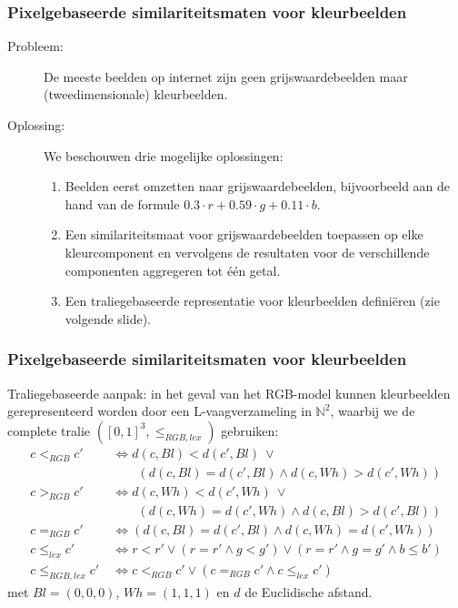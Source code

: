 \documentclass[dutch]{beamer}
\theoremstyle{definition}
\theoremstyle{remark}
\theoremstyle{example}
\begin{document}
{
  \frametitle{Pixelgebaseerde similariteitsmaten voor kleurbeelden}
  
  \begin{description}
     \item[Probleem:] De meeste beelden op internet zijn 
     geen grijswaardebeelden maar (tweedimensionale) kleurbeelden.
     \item[Oplossing:] We beschouwen drie mogelijke oplossingen:
     \begin{enumerate}
       \item Beelden eerst omzetten naar grijswaardebeelden, bijvoorbeeld aan de 
       hand van de formule $0.3 \cdot r + 0.59 \cdot g + 0.11 \cdot b$.
       \item Een similariteitsmaat voor grijswaardebeelden toepassen op elke
       kleurcomponent en vervolgens de resultaten voor de verschillende componenten
       aggregeren tot \'e\'en getal.
       \item Een traliegebaseerde representatie voor kleurbeelden defini\"eren (zie
       volgende slide).
     \end{enumerate}
   \end{description}
}
\frame
{
  \frametitle{Pixelgebaseerde similariteitsmaten voor kleurbeelden}

  Traliegebaseerde aanpak: in het geval van het RGB-model kunnen kleurbeelden 
  gerepresenteerd worden door een L-vaagverzameling in $\mathbb{N}^2$,
  waarbij we de complete tralie $([0,1]^3, \le_{RGB,lex})$ gebruiken:
  \begin{align*}
  \scriptstyle c <_{RGB} c' & \scriptstyle\ \iff d(c,Bl) < d(c',Bl)\ \lor \\
			 & \scriptstyle\ \qquad (d(c,Bl) = d(c',Bl) \land d(c,Wh) > d(c',Wh)) \\
  \scriptstyle c >_{RGB} c' & \scriptstyle\ \iff d(c,Wh) < d(c',Wh)\ \lor \\
			 & \scriptstyle\ \qquad(d(c,Wh) = d(c',Wh) \land d(c,Bl) > d(c',Bl)) \\
  \scriptstyle c =_{RGB} c' & \scriptstyle\ \iff (d(c,Bl) = d(c',Bl) \land d(c,Wh) = d(c',Wh)) \\
  \scriptstyle c \leq_{lex} c' & \scriptstyle\ \iff r < r' \lor (r = r' \land g < g') \lor (r = r' \land g = g' \land b \leq b') \\
  \scriptstyle c \leq_{RGB,lex} c' & \scriptstyle\ \iff c <_{RGB} c' \lor (c =_{RGB} c' \land c \leq_{lex} c')
  \end{align*}
  met $Bl = (0,0,0)$, $Wh = (1,1,1)$ en $d$ de Euclidische afstand.
}
\end{document}
